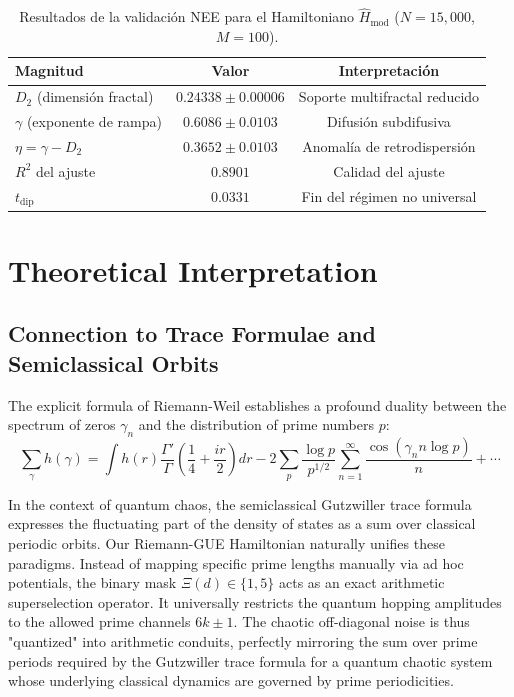 \documentclass[aps,prl,preprint,superscriptaddress,floatfix]{revtex4-2}
\begin{document}
\begin{table}[h]
\caption{\label{tab:resultados_finales} Resultados de la validación NEE para el Hamiltoniano $\hat{H}_{\text{mod}}$ ($N=15,000$, $M=100$).}
\begin{ruledtabular}
\begin{tabular}{lcc}
\textbf{Magnitud} & \textbf{Valor} & \textbf{Interpretación} \\
\hline
$D_2$ (dimensión fractal) & $0.24338 \pm 0.00006$ & Soporte multifractal reducido \\
$\gamma$ (exponente de rampa) & $0.6086 \pm 0.0103$ & Difusión subdifusiva \\
$\eta = \gamma - D_2$ & $0.3652 \pm 0.0103$ & Anomalía de retrodispersión \\
$R^2$ del ajuste & $0.8901$ & Calidad del ajuste \\
$t_{\text{dip}}$ & $0.0331$ & Fin del régimen no universal \\
\end{tabular}
\end{ruledtabular}
\end{table}

\section{Theoretical Interpretation}

\subsection{Connection to Trace Formulae and Semiclassical Orbits}

The explicit formula of Riemann-Weil establishes a profound duality between the spectrum of zeros $\gamma_n$ and the distribution of prime numbers $p$:
\begin{equation}
\sum_{\gamma} h(\gamma) = \int h(r) \frac{\Gamma'}{\Gamma}\left(\frac14 + \frac{ir}{2}\right) dr - 2\sum_{p} \frac{\log p}{p^{1/2}} \sum_{n=1}^\infty \frac{\cos(\gamma_n n\log p)}{n} + \cdots
\end{equation}

In the context of quantum chaos, the semiclassical Gutzwiller trace formula expresses the fluctuating part of the density of states as a sum over classical periodic orbits. Our Riemann-GUE Hamiltonian naturally unifies these paradigms. Instead of mapping specific prime lengths manually via ad hoc potentials, the binary mask $\Xi(d) \in \{1,5\}$ acts as an exact arithmetic superselection operator. It universally restricts the quantum hopping amplitudes to the allowed prime channels $6k\pm1$. The chaotic off-diagonal noise is thus "quantized" into arithmetic conduits, perfectly mirroring the sum over prime periods required by the Gutzwiller trace formula for a quantum chaotic system whose underlying classical dynamics are governed by prime periodicities.
\end{document}
